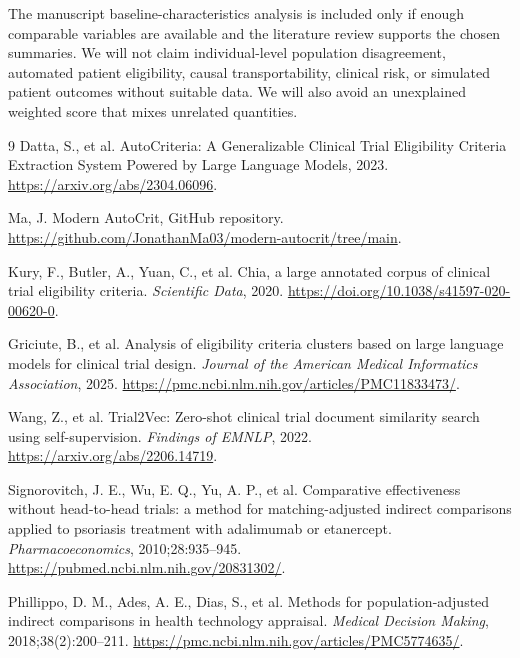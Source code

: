 \documentclass[11pt]{article}
\begin{document}
The manuscript baseline-characteristics analysis is included only if enough comparable variables are available and the literature review supports the chosen summaries. We will not claim individual-level population disagreement, automated patient eligibility, causal transportability, clinical risk, or simulated patient outcomes without suitable data. We will also avoid an unexplained weighted score that mixes unrelated quantities.

\begin{thebibliography}{9}
Datta, S., et al.
AutoCriteria: A Generalizable Clinical Trial Eligibility Criteria Extraction System Powered by Large Language Models, 2023.
\url{https://arxiv.org/abs/2304.06096}.

Ma, J.
Modern AutoCrit, GitHub repository.
\url{https://github.com/JonathanMa03/modern-autocrit/tree/main}.

Kury, F., Butler, A., Yuan, C., et al.
Chia, a large annotated corpus of clinical trial eligibility criteria.
\emph{Scientific Data}, 2020.
\url{https://doi.org/10.1038/s41597-020-00620-0}.

Griciute, B., et al.
Analysis of eligibility criteria clusters based on large language models for clinical trial design.
\emph{Journal of the American Medical Informatics Association}, 2025.
\url{https://pmc.ncbi.nlm.nih.gov/articles/PMC11833473/}.

Wang, Z., et al.
Trial2Vec: Zero-shot clinical trial document similarity search using self-supervision.
\emph{Findings of EMNLP}, 2022.
\url{https://arxiv.org/abs/2206.14719}.

Signorovitch, J. E., Wu, E. Q., Yu, A. P., et al.
Comparative effectiveness without head-to-head trials: a method for matching-adjusted indirect comparisons applied to psoriasis treatment with adalimumab or etanercept.
\emph{Pharmacoeconomics}, 2010;28:935--945.
\url{https://pubmed.ncbi.nlm.nih.gov/20831302/}.

Phillippo, D. M., Ades, A. E., Dias, S., et al.
Methods for population-adjusted indirect comparisons in health technology appraisal.
\emph{Medical Decision Making}, 2018;38(2):200--211.
\url{https://pmc.ncbi.nlm.nih.gov/articles/PMC5774635/}.
\end{thebibliography}
\end{document}
